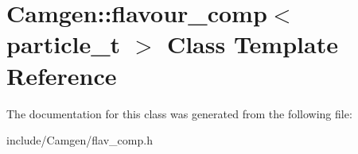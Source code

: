 \hypertarget{a00226}{\section{Camgen\-:\-:flavour\-\_\-comp$<$ particle\-\_\-t $>$ Class Template Reference}
\label{a00226}
}


The documentation for this class was generated from the following file\-:\begin{DoxyCompactItemize}
\item 
include/\-Camgen/flav\-\_\-comp.\-h\end{DoxyCompactItemize}
